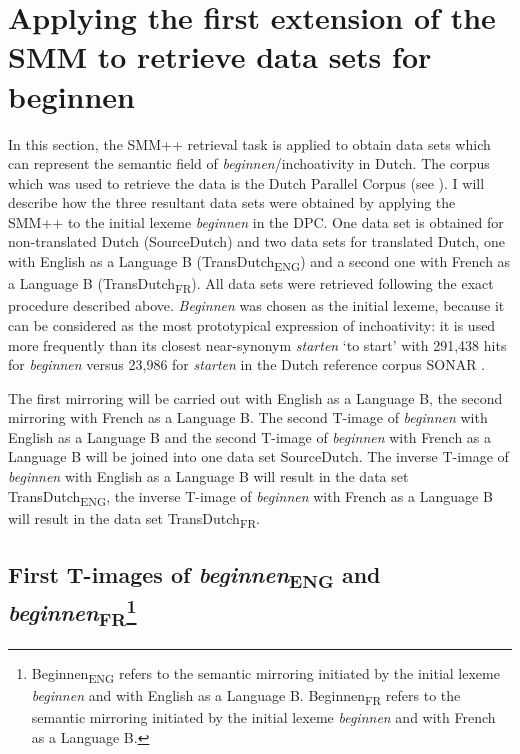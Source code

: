 \section{Applying the first extension of the SMM to retrieve data sets for beginnen}
\label{sec:3.6}
In this section, the SMM++ retrieval task is applied to obtain data sets which can represent the semantic field of \textit{beginnen}/inchoativity in Dutch. The corpus which was used to retrieve the data is the Dutch Parallel Corpus (see ). I will describe how the three resultant data sets were obtained by applying the SMM++ to the initial lexeme \textit{beginnen} in the DPC. One data set is obtained for non-translated Dutch (SourceDutch) and two data sets for translated Dutch, one with English as a Language B (TransDutch\textsubscript{ENG}) and a second one with French as a Language B (TransDutch\textsubscript{FR}). All data sets were retrieved following the exact procedure described above. \textit{Beginnen} was chosen as the initial lexeme, because it can be considered as the most prototypical expression of inchoativity: it is used more frequently than its closest near-synonym \textit{starten} `to start' with 291,438 hits for \textit{beginnen} versus 23,986 for \textit{starten} in the Dutch reference corpus SONAR \citep{spyns_construction_2013}.

The first mirroring will be carried out with English as a Language B, the second mirroring with French as a Language B. The second T-image of \textit{beginnen} with English as a Language B and the second T-image of \textit{beginnen} with French as a Language B will be joined into one data set SourceDutch. The inverse T-image of \textit{beginnen} with English as a Language B will result in the data set TransDutch\textsubscript{ENG}, the inverse T-image of \textit{beginnen} with French as a Language B will result in the data set TransDutch\textsubscript{FR}.

\subsection[tocentry={First T-images of \textit{beginnen}\textsubscript{ENG} and \textit{beginnen}\textsubscript{FR}},head={First T-images of \textit{beginnen}\textsubscript{ENG} and \textit{beginnen}\textsubscript{FR}}]{First T-images of \textit{beginnen}\textsubscript{ENG} and \textit{beginnen}\textsubscript{FR}\protect\footnote{Beginnen\textsubscript{ENG} refers to the semantic mirroring initiated by the initial lexeme \textit{beginnen} and with English as a Language B. Beginnen\textsubscript{FR} refers to the semantic mirroring initiated by the initial lexeme \textit{beginnen} and with French as a Language B.}}\label{sec:3.6.1}

